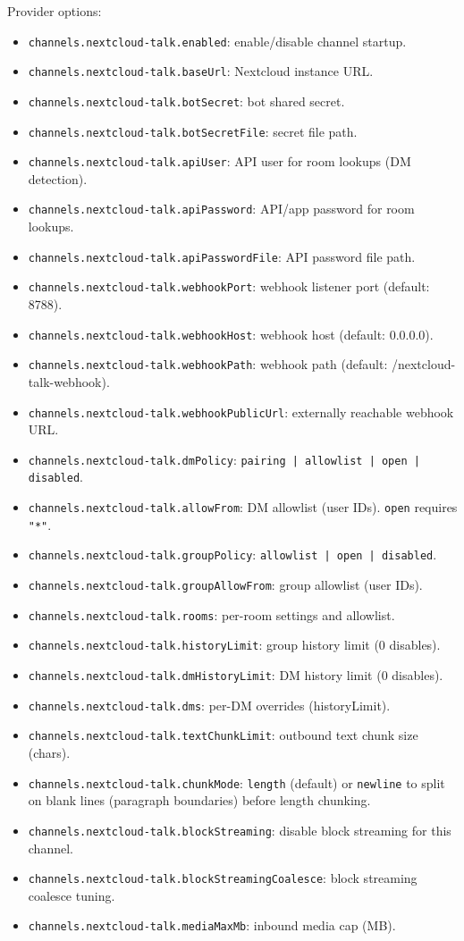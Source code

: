 Provider options:

\begin{itemize}
  \item \texttt{channels.nextcloud-talk.enabled}: enable/disable channel startup.
  \item \texttt{channels.nextcloud-talk.baseUrl}: Nextcloud instance URL.
  \item \texttt{channels.nextcloud-talk.botSecret}: bot shared secret.
  \item \texttt{channels.nextcloud-talk.botSecretFile}: secret file path.
  \item \texttt{channels.nextcloud-talk.apiUser}: API user for room lookups (DM detection).
  \item \texttt{channels.nextcloud-talk.apiPassword}: API/app password for room lookups.
  \item \texttt{channels.nextcloud-talk.apiPasswordFile}: API password file path.
  \item \texttt{channels.nextcloud-talk.webhookPort}: webhook listener port (default: 8788).
  \item \texttt{channels.nextcloud-talk.webhookHost}: webhook host (default: 0.0.0.0).
  \item \texttt{channels.nextcloud-talk.webhookPath}: webhook path (default: /nextcloud-talk-webhook).
  \item \texttt{channels.nextcloud-talk.webhookPublicUrl}: externally reachable webhook URL.
  \item \texttt{channels.nextcloud-talk.dmPolicy}: \texttt{pairing | allowlist | open | disabled}.
  \item \texttt{channels.nextcloud-talk.allowFrom}: DM allowlist (user IDs). \texttt{open} requires \texttt{"*"}.
  \item \texttt{channels.nextcloud-talk.groupPolicy}: \texttt{allowlist | open | disabled}.
  \item \texttt{channels.nextcloud-talk.groupAllowFrom}: group allowlist (user IDs).
  \item \texttt{channels.nextcloud-talk.rooms}: per-room settings and allowlist.
  \item \texttt{channels.nextcloud-talk.historyLimit}: group history limit (0 disables).
  \item \texttt{channels.nextcloud-talk.dmHistoryLimit}: DM history limit (0 disables).
  \item \texttt{channels.nextcloud-talk.dms}: per-DM overrides (historyLimit).
  \item \texttt{channels.nextcloud-talk.textChunkLimit}: outbound text chunk size (chars).
  \item \texttt{channels.nextcloud-talk.chunkMode}: \texttt{length} (default) or \texttt{newline} to split on blank lines (paragraph boundaries) before length chunking.
  \item \texttt{channels.nextcloud-talk.blockStreaming}: disable block streaming for this channel.
  \item \texttt{channels.nextcloud-talk.blockStreamingCoalesce}: block streaming coalesce tuning.
  \item \texttt{channels.nextcloud-talk.mediaMaxMb}: inbound media cap (MB).
\end{itemize}
